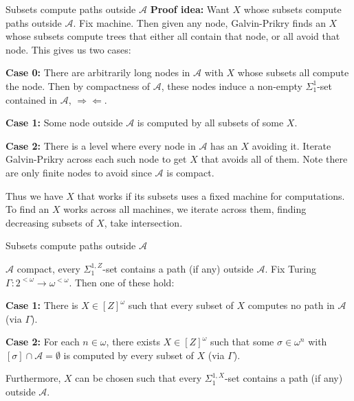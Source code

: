 \begin{frame}[shrink=3]{Subsets compute paths outside $\mathcal{A}$}
  \textbf{Proof idea:} Want $X$ whose subsets compute paths outside
  $\mathcal{A}$. Fix machine. Then given any node, Galvin-Prikry finds
  an $X$ whose subsets compute trees that either all contain that node, or
  all avoid that node. This gives us two cases:

  \vspace{1em}
  \textbf{Case 0:} There are arbitrarily long nodes in $\mathcal{A}$ with
  $X$ whose subsets all compute the node. Then by compactness of
  $\mathcal{A}$, these nodes induce a non-empty $\Sigma_1^1$-set contained
  in $\mathcal{A}$, $\Rightarrow\Leftarrow$.

  \vspace{0.5em}
  \textbf{Case 1:} Some node outside $\mathcal{A}$ is computed by all
  subsets of some $X$.

  \vspace{0.5em}
  \textbf{Case 2:} There is a level where every node in $\mathcal{A}$ has
  an $X$ avoiding it. Iterate Galvin-Prikry across each such node to get
  $X$ that avoids all of them. Note there are only finite nodes to avoid
  since $\mathcal{A}$ is compact.

  \vspace{1em}
  Thus we have $X$ that works if its subsets uses a fixed machine for
  computations. To find an $X$ works across all machines, we iterate across
  them, finding decreasing subsets of $X$, take intersection.
\end{frame}

\begin{frame}{Subsets compute paths outside $\mathcal{A}$}
  \begin{lemma}
    $\mathcal{A}$ compact, every $\Sigma_1^{1,Z}$-set contains a path
    (if any) outside $\mathcal{A}$. Fix Turing $\Gamma:2^{<\omega}
    \rightarrow \omega^{<\omega}$. Then one of these hold:

    \vspace{0.5em}
    \textbf{Case 1:} There is $X\in[Z]^\omega$ such that every subset of
    $X$ computes no path in $\mathcal{A}$ (via $\Gamma$).

    \vspace{0.5em}
    \textbf{Case 2:} For each $n\in\omega$, there exists $X\in[Z]^\omega$
    such that some $\sigma\in\omega^n$ with
    $[\sigma]\cap\mathcal{A}=\emptyset$ is computed by every subset of $X$
    (via $\Gamma$).

    \vspace{0.5em}
    Furthermore, $X$ can be chosen such that every $\Sigma_1^{1,X}$-set
    contains a path (if any) outside $\mathcal{A}$.
  \end{lemma}
\end{frame}

